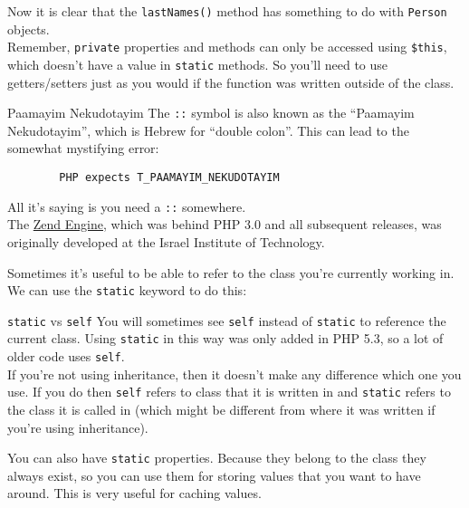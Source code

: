 Now it is clear that the \texttt{lastNames()} method has something to do with \texttt{Person} objects.
\\

Remember, \texttt{private} properties and methods can only be accessed using \texttt{\$this}, which doesn't have a value in \texttt{static} methods. So you'll need to use getters/setters just as you would if the function was written outside of the class.

\pagebreak

\begin{infobox}{Paamayim Nekudotayim}
    The \texttt{::} symbol is also known as the ``Paamayim Nekudotayim'', which is Hebrew for ``double colon''. This can lead to the somewhat mystifying error:

    \begin{verbatim}
        PHP expects T_PAAMAYIM_NEKUDOTAYIM
    \end{verbatim}

    All it's saying is you need a \texttt{::} somewhere.
    \\

    The \href{https://en.wikipedia.org/wiki/Zend_Engine}{Zend Engine}, which was behind PHP 3.0 and all subsequent releases, was originally developed at the Israel Institute of Technology.
\end{infobox}

Sometimes it's useful to be able to refer to the class you're currently working in. We can use the \texttt{static} keyword to do this:


\begin{infobox}{\texttt{static} vs \texttt{self}}
    You will sometimes see \texttt{self} instead of \texttt{static} to reference the current class. Using \texttt{static} in this way was only added in PHP 5.3, so a lot of older code uses \texttt{self}.
    \\

    If you're not using inheritance, then it doesn't make any difference which one you use. If you do then \texttt{self} refers to class that it is written in and \texttt{static} refers to the class it is called in (which might be different from where it was written if you're using inheritance).
\end{infobox}

You can also have \texttt{static} properties. Because they belong to the class they always exist, so you can use them for storing values that you want to have around. This is very useful for caching values.
\\

